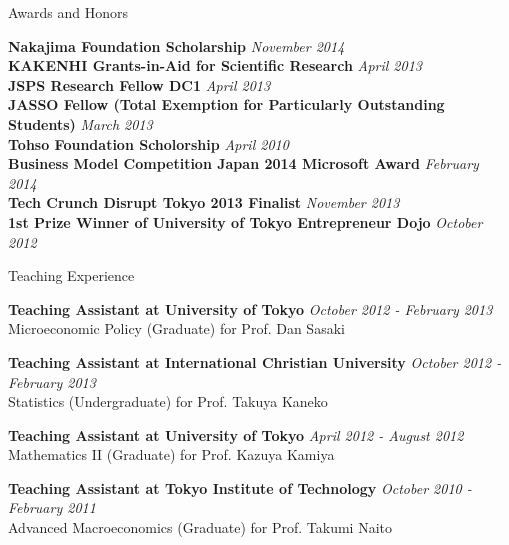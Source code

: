 \documentclass{resume} %
\begin{document}
\begin{rSection}{Awards and Honors}

{\bf Nakajima Foundation Scholarship} \hfill {\em November 2014} \\
{\bf KAKENHI Grants-in-Aid for Scientific Research} \hfill {\em April 2013} \\
{\bf JSPS Research Fellow DC1} \hfill {\em April 2013} \\
{\bf JASSO Fellow (Total Exemption for Particularly Outstanding Students) } \hfill {\em March 2013} \\
{\bf Tohso Foundation Scholorship} \hfill {\em April 2010} \\

{\bf Business Model Competition Japan 2014 Microsoft Award} \hfill {\em February 2014} \\
{\bf Tech Crunch Disrupt Tokyo 2013 Finalist} \hfill {\em November 2013} \\
{\bf 1st Prize Winner of University of Tokyo Entrepreneur Dojo} \hfill {\em October 2012} \\
\end{rSection}


\begin{rSection}{Teaching Experience}

{\bf Teaching Assistant at University of Tokyo} \hfill {\em October 2012 - February 2013} \\
Microeconomic Policy (Graduate) for Prof. Dan Sasaki

{\bf Teaching Assistant at International Christian University} \hfill {\em October 2012 - February 2013} \\
Statistics (Undergraduate) for Prof. Takuya Kaneko

{\bf Teaching Assistant at University of Tokyo} \hfill {\em April 2012 - August 2012} \\
Mathematics II (Graduate) for Prof. Kazuya Kamiya

{\bf Teaching Assistant at Tokyo Institute of Technology} \hfill {\em October 2010 - February 2011} \\
Advanced Macroeconomics (Graduate) for Prof. Takumi Naito

\end{rSection}
\end{document}
